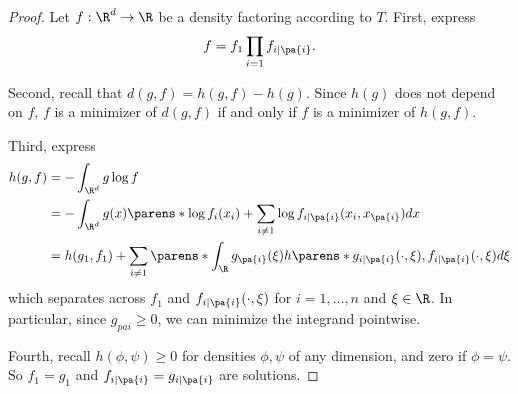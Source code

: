 \begin{proof}Let $f: \R ^d \to \R $ be a density factoring according to $T$.
First, express
\[
f = f_1 \prod_{i = 1} f_{i \mid \pa{i}}.
\]

Second, recall that $d(g, f) = h(g, f) - h(g)$.
Since $h(g)$ does not depend on $f$, $f$ is a minimizer of $d(g, f)$ if and only if $f$ is a minimizer of $h(g, f)$.

Third, express
\[
\begin{aligned}
h(g, f) &= - \int_{\R ^d} g \log f \\
&= - \int_{\R ^d} g(x) \parens*{ \log f_{i}(x_i) + \sum_{i \neq 1} \log f_{i \mid \pa{i}}(x_i, x_{\pa{i}})} dx \\
&= h(g_1, f_1) + \sum_{i \neq 1} \parens*{ \int_{\R } g_{\pa{i}}(\xi ) h\parens*{g_{i \mid \pa{i}}(\cdot , \xi ), f_{i\mid\pa{i}}(\cdot ,\xi )}d\xi }
\end{aligned}
\]
which separates across $f_1$ and $f_{i \mid \pa{i}}(\cdot , \xi )$ for $i = 1, \dots , n$ and $\xi  \in \R $.
In particular, since $g_{pa{i}} \geq 0$, we can minimize the integrand pointwise.

Fourth, recall $h(\phi , \psi ) \geq 0$ for densities $\phi , \psi $ of any dimension, and zero if $\phi  = \psi $.
So $f_1 = g_1$ and $f_{i \mid \pa{i}} = g_{i \mid \pa{i}}$ are solutions.
\end{proof}

